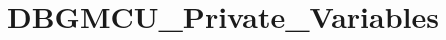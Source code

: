 \hypertarget{group___d_b_g_m_c_u___private___variables}{}\section{D\+B\+G\+M\+C\+U\+\_\+\+Private\+\_\+\+Variables}
\label{group___d_b_g_m_c_u___private___variables}
